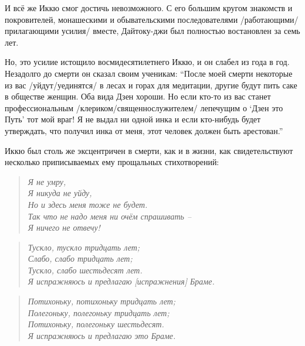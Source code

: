 \begin{ver}
И всё же Иккю смог достичь невозможного. С его большим кругом
знакомств и покровителей, монашескими и обывательскими последователями
/работающими/прилагающими усилия/ вместе, Дайтоку-джи был полностью
востановлен за семь лет.

Но, это усилие истощило восмидесятилетнего Иккю, и он слабел из года в
год.  Незадолго до смерти он сказал своим ученикам: ``После моей
смерти некоторые из вас /уйдут/уединятся/ в лесах и горах для
медитации, другие будут пить саке в обществе женщин. Оба вида Дзен
хороши. Но если кто-то из вас станет профессиональным
/клериком/священнослужителем/ лепечущим о `Дзен это
Путь' тот мой враг! Я не выдал ни одной инка и если кто-нибудь будет
утверждать, что получил инка от меня, этот человек должен быть арестован.''
\end{ver}

\begin{ver}
  Иккю был столь же эксцентричен в смерти, как и в жизни, как
  свидетельствуют несколько приписываемых ему прощальных стихотворений: 
\end{ver}

\begin{ver}
  \begin{verse}\it
    Я не умру,\\
    Я никуда не уйду,\\
    Но и здесь меня тоже не будет.\\
    Так что не надо меня ни очём спрашивать --\\
    Я ничего не отвечу!
  \end{verse}
\end{ver}

\begin{ver}
  \begin{verse}\it
    Тускло, тускло тридцать лет;\\
    Слабо, слабо тридцать лет;\\
    Тускло, слабо шестьдесят лет.\\
    Я испражняюсь и предлагаю [испражнения] Браме.
  \end{verse}
\end{ver}

\begin{ver}[1]
  \begin{verse}\it
    Потихоньку, потихоньку тридцать лет;\\
    Полегоньку, полегоньку тридцать лет;\\
    Потихоньку, полегоньку шестьдесят.\\
    Я испражняюсь и предлагаю это Браме.
  \end{verse}
\end{ver}

